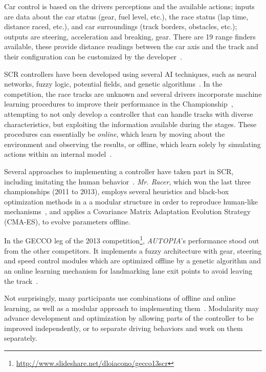Car control is based on the drivers perceptions and the available actions; inputs are data about the car status (gear, fuel level, etc.), the race status (lap time, distance raced, etc.), and car surroundings (track borders, obstacles, etc.); outputs are steering, acceleration and breaking, gear. There are 19 range finders available, these provide distance readings between the car axis and the track and their configuration can be customized by the developer~\cite{SCR}.

SCR controllers have been developed using several AI techniques, such as neural networks, fuzzy logic, potential fields, and genetic algorithms~\cite{Loiacono:2012:LEA:2212908.2212953}. In the competition, the race tracks are unknown and several drivers incorporate machine learning procedures to improve their performance in the Championship~\cite{2009}, attempting to not only develop a controller that can handle tracks with diverse characteristics, but exploiting the information available during the stages. These procedures can essentially be \emph{online}, which learn by moving about the environment and observing the results, or offline, which learn solely by simulating actions within an internal model~\cite{mitchell_1997}.

Several approaches to implementing a controller have taken part in SCR, including imitating the human behavior~\cite{Exp,5593318}. \emph{Mr. Racer}, which won the last three championships (2011 to 2013), employs several heuristics and black-box optimization methods in a a modular structure in order to reproduce human-like mechanisms~\cite{MrRacer}, and applies a Covariance Matrix Adaptation Evolution Strategy (CMA-ES), to evolve parameters offline.

In the GECCO leg of the 2013 competition\footnote{\url{http://www.slideshare.net/dloiacono/gecco13scr}}, \emph{AUTOPIA}'s performance stood out from the other competitors. It implements a fuzzy architecture with gear, steering and speed control modules which are optimized offline by a genetic algorithm and an online learning mechanism for landmarking lane exit points to avoid leaving the track~\cite{AUTOPIA}.

Not surprisingly, many participants use combinations of offline and online learning, as well as a modular approach to implementing them~\cite{2009,DIEGO,Exp}. Modularity may advance development and optimization by allowing parts of the controller to be improved independently\cite{MrRacer,AUTOPIA2009}, or to separate driving behaviors and work on them separately.



